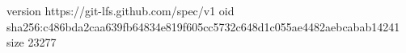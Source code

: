 version https://git-lfs.github.com/spec/v1
oid sha256:c486bda2caa639fb64834e819f605cc5732c648d1c055ae4482aebcabab14241
size 23277

